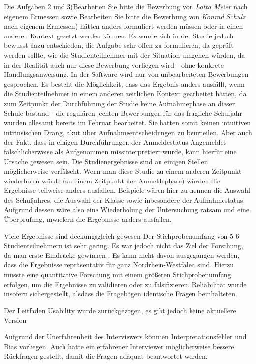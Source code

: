 Die Aufgaben 2 und 3(\glqq Bearbeiten Sie bitte die Bewerbung von \textit{Lotta Meier} nach eigenem Ermessen\grqq{} sowie \glqq{} Bearbeiten Sie bitte die Bewerbung von \textit{Konrad Schulz} nach eigenem Ermessen\grqq{}) hätten anders formuliert werden müssen oder in einen anderen Kontext gesetzt werden können. Es wurde sich in der Studie jedoch bewusst dazu entschieden, die Aufgabe sehr offen zu formulieren, da geprüft werden sollte, wie die Studienteilnehmer mit der Situation umgehen würden, da in der Realität auch nur diese Bewerbung vorliegen wird - ohne konkrete Handlungsanweisung. In der Software wird nur von \glqq unbearbeiteten Bewerbungen\grqq{} gesprochen. Es besteht die Möglichkeit, dass das Ergebnis anders ausfällt, wenn die Studienteilnehmer in einem anderen zeitlichen Kontext gearbeitet hätten, da zum Zeitpunkt der Durchführung der Studie keine Aufnahmephase an dieser Schule bestand - die regulären, echten Bewerbungen für das fragliche Schuljahr wurden allesamt bereits im Februar bearbeitet. Sie hatten somit keinen intuitiven intrinsischen Drang, akut über Aufnahmeentscheidungen zu beurteilen. Aber auch der Fakt, dass in einigen Durchführungen der Anmeldestatus \glqq Angemeldet\grqq{} fälschlicherweise als \glqq Aufgenommen\grqq{} missinterpretiert wurde, kann hierfür eine Ursache gewesen sein.
Die Studienergebnisse sind an einigen Stellen möglicherweise verfälscht. Wenn man diese Studie zu einem anderen Zeitpunkt wiederholen würde (zu einem Zeitpunkt der Anmeldephase) würden die Ergebnisse teilweise anders ausfallen. Beispiele wären hier zu nennen die Auswahl des Schuljahres, die Auswahl der Klasse sowie inbesondere der Aufnahmestatus. Aufgrund dessen wäre also eine Wiederholung der Untersuchung ratsam und eine Überprüfung, inwiefern die Ergebnisse anders ausfallen.

Viele Ergebnisse sind deckungsgleich gewesen
Der Stichprobenumfang von 5-6 Studienteilnehmern ist sehr gering. Es war jedoch nicht das Ziel der Forschung, da man erste Eindrücke gewinnen . Es kann nicht davon ausgegangen werden, dass die Ergebnisse repräsentativ für ganz Nordrhein-Westfalen sind. Hierzu müsste eine quantitative Forschung mit einem größeren Stichprobenumfang erfolgen, um die Ergebnisse zu validieren oder zu falsifizieren.
Reliabilität wurde insofern sichergestellt, alsdass die Fragebögen identische Fragen beinhalteten. 

Der Leitfaden Usability wurde zurückgezogen, es gibt jedoch keine aktuellere Version

Aufgrund der Unerfahrenheit des Interviewers könnten Interpretationsfehler und Bias vorliegen. Auch hätte ein erfahrener Interviewer möglicherweise bessere Rückfragen gestellt, damit die Fragen adäquat beantwortet werden.

